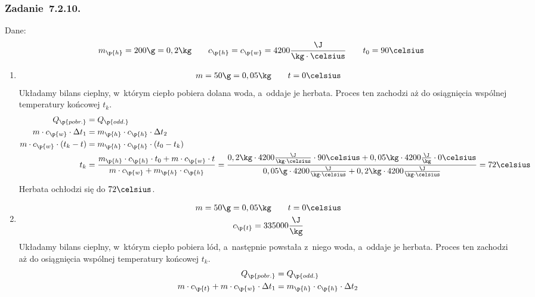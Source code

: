\subsubsection*{Zadanie~7.2.10.}
Dane:
\begin{gather*}
    m_\p{h} = 200\g = 0,2\kg \qquad c_\p{h} = c_\p{w} = 4200\frac{\J}{\kg \cdot \celsius} \qquad t_0 = 90\celsius
\end{gather*}
\begin{enumerate}[label={\alph*)}]
    \item
        \begin{gather*}
            m = 50\g = 0,05\kg \qquad t = 0\celsius
        \end{gather*}
        Układamy bilans cieplny, w~którym ciepło pobiera dolana woda, a~oddaje je herbata. Proces ten zachodzi aż do osiągnięcia wspólnej temperatury końcowej \(t_k\).
        \begin{align*}
            Q_\p{pobr.} &= Q_\p{odd.}\\
            m \cdot c_\p{w} \cdot \Delta t_1 &= m_\p{h} \cdot c_\p{h} \cdot \Delta t_2\\
            m \cdot c_\p{w} \cdot (t_k - t) &= m_\p{h} \cdot c_\p{h} \cdot (t_0 - t_k)\\
            t_k &= \frac{m_\p{h} \cdot c_\p{h} \cdot t_0 + m \cdot c_\p{w} \cdot t}{m \cdot c_\p{w} + m_\p{h} \cdot c_\p{h}}
                = \frac{0,2\kg \cdot 4200\frac{\J}{\kg \cdot \celsius} \cdot 90\celsius + 0,05\kg \cdot 4200\frac{\J}{\kg} \cdot 0\celsius}{0,05\g \cdot 4200\frac{\J}{\kg \cdot \celsius} + 0,2\kg \cdot 4200\frac{\J}{\kg \cdot \celsius}}
                = 72\celsius
        \end{align*}
        Herbata ochłodzi się do \(72\celsius\).
    \item
        \begin{gather*}
            m = 50\g = 0,05\kg \qquad t = 0\celsius\\
            c_\p{t} = 335000\frac{\J}{\kg}
        \end{gather*}
        Układamy bilans cieplny, w~którym ciepło pobiera lód, a~następnie powstała z~niego woda, a~oddaje je herbata. Proces ten zachodzi aż do osiągnięcia wspólnej temperatury końcowej \(t_k\).
        \begin{align*}
            Q_\p{pobr.} &= Q_\p{odd.}\\
            m \cdot c_\p{t} + m \cdot c_\p{w} \cdot \Delta t_1 &= m_\p{h} \cdot c_\p{h} \cdot \Delta t_2\\
            \begin{split}

\end{split}
\end{align*}
\end{enumerate}
